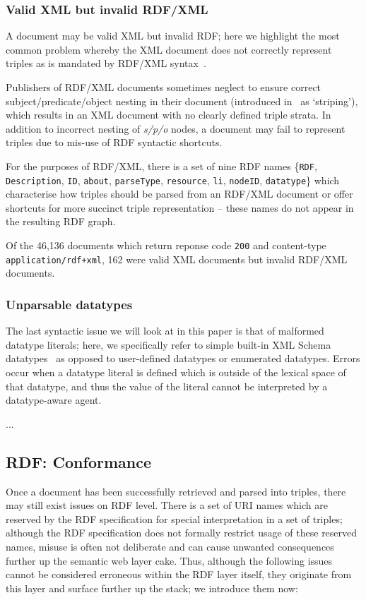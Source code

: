 \documentclass{llncs}
\begin{document}
\subsubsection{Valid XML but invalid RDF/XML}
A document may be valid XML but invalid RDF; here we highlight the most common problem whereby the XML document does not correctly represent triples as is mandated by RDF/XML syntax~\cite{key:rdfxml}.

Publishers of RDF/XML documents sometimes neglect to ensure correct subject/predicate/object nesting in their document (introduced in~\cite{key:rdfxml} as `striping'), which results in an XML document with no clearly defined triple strata. In addition to incorrect nesting of \textit{s/p/o} nodes, a document may fail to represent triples due to mis-use of RDF syntactic shortcuts.

For the purposes of RDF/XML, there is a set of nine RDF names \{{\tt RDF}, {\tt Description},  {\tt ID}, {\tt about}, {\tt parseType}, {\tt resource}, {\tt li}, {\tt nodeID}, {\tt datatype}\} which characterise how triples should be parsed from an RDF/XML document or offer shortcuts for more succinct triple representation -- these names do not appear in the resulting RDF graph. 

Of the 46,136 documents which return reponse code {\tt\small 200} and content-type {\tt\small application/rdf+xml}, 162 were valid XML documents but invalid RDF/XML documents.

\subsubsection{Unparsable datatypes}
The last syntactic issue we will look at in this paper is that of malformed datatype literals; here, we specifically refer to simple built-in XML Schema datatypes~\cite{key:xmlsdts} as opposed to user-defined datatypes or enumerated datatypes. Errors occur when a datatype literal is defined which is outside of the lexical space of that datatype, and thus the value of the literal cannot be interpreted by a datatype-aware agent.

...

\subsection{RDF: Conformance}
Once a document has been successfully retrieved and parsed into triples, there may still exist issues on RDF level. 
There is a set of URI names which are reserved by the RDF specification for special interpretation in a set of triples; although the RDF specification does not formally restrict usage of these reserved names, misuse is often not deliberate and can cause unwanted consequences further up the semantic web layer cake.
Thus, although the following issues cannot be considered erroneous within the RDF layer itself, they originate from this layer and surface further up the stack; we introduce them now:
\end{document}
